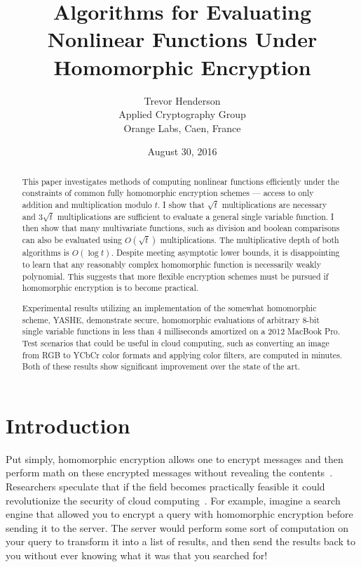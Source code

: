 \documentclass{article}
\title{%
  Algorithms for Evaluating Nonlinear Functions Under Homomorphic Encryption
}
\author{Trevor Henderson\\{\small Applied Cryptography Group}\\{\small Orange Labs, Caen, France}}
\date{August 30, 2016}
\begin{document}
\maketitle

    \begin{abstract}

        This paper investigates methods of computing nonlinear functions efficiently
        under the constraints of common fully homomorphic encryption schemes
        --- access to only addition and multiplication modulo $t$.
        I show that $\sqrt{t}$ multiplications are necessary 
        and $3\sqrt{t}$ multiplications are sufficient to evaluate
        a general single variable function.
        I then show that many multivariate functions, such as division
        and boolean comparisons can also be evaluated using
        $O(\sqrt{t})$ multiplications.
        The multiplicative depth of both algorithms is $O(\log t)$.
        Despite meeting asymptotic lower bounds,
        it is disappointing to learn that
        any reasonably complex homomorphic function is necessarily weakly polynomial.
        This suggests that more flexible encryption schemes must be pursued if
        homomorphic encryption is to become practical.

        Experimental results utilizing an 
        implementation of the somewhat homomorphic scheme,
        YASHE, demonstrate
        secure, homomorphic evaluations of arbitrary
        8-bit single variable functions 
        in less than 4 milliseconds amortized
        on a 2012 MacBook Pro.
        Test scenarios that could be useful in cloud computing,
        such as converting an image from RGB
        to YCbCr color formats and applying color filters,
        are computed in minutes.
        Both of these results show significant improvement over the
        state of the art.
    \end{abstract}

    \section{Introduction}
        Put simply, homomorphic encryption allows one to encrypt messages
        and then
        perform math on these encrypted messages without revealing the contents~\cite{firstImp}.
        Researchers speculate that if the field becomes practically feasible it could revolutionize the security of cloud computing~\cite{cloud}.
        For example, imagine a search engine that allowed you to encrypt a query with homomorphic encryption before sending it to the server.
        The server would perform some sort of computation on your query to transform it into a list of results,
        and then send the results back to you without ever knowing what it was that you searched for!
\end{document}
